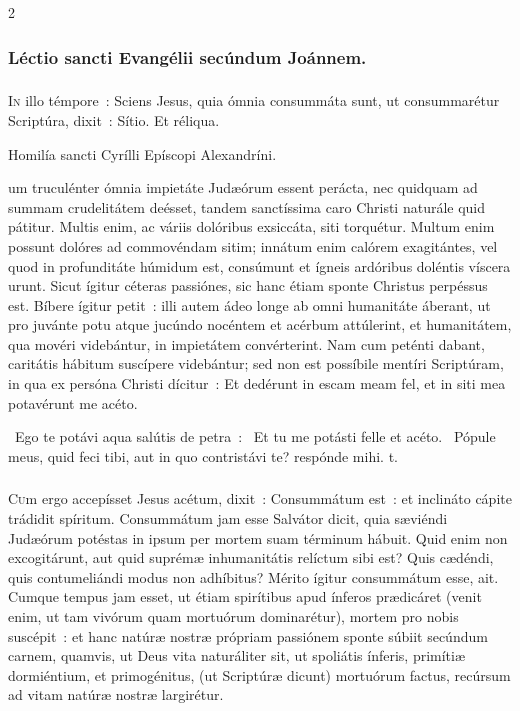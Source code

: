 \documentclass[9pt,twoside]{extarticle}
\begin{document}
\begin{multicols}{2}
{\subsubsection*{\center Léctio sancti Evangélii secúndum Joánnem.}
\subsubsection*{\center {}}
\lettrine{I}n illo témpore~: Sciens Jesus, quia ómnia consummáta sunt, ut consummarétur Scriptúra, dixit~: Sítio. Et réliqua.

\begin{center}Homilía sancti Cyrílli Epíscopi Alexandríni.\\
\end{center}
um truculénter ómnia impietáte Judæórum essent perácta, nec quidquam ad summam crudelitátem deésset, tandem sanctíssima caro Christi naturále quid pátitur. Multis enim, ac váriis dolóribus exsiccáta, siti torquétur. Multum enim possunt dolóres ad commovéndam sitim; innátum enim calórem exagitántes, vel quod in profunditáte húmidum est, consúmunt et ígneis ardóribus doléntis víscera urunt. Sicut ígitur céteras passiónes, sic hanc étiam sponte Christus perpéssus est. Bíbere ígitur petit~: illi autem ádeo longe ab omni humanitáte áberant, ut pro juvánte potu atque jucúndo nocéntem et acérbum attúlerint, et humanitátem, qua movéri videbántur, in impietátem convérterint. Nam cum peténti dabant, caritátis hábitum suscípere videbántur; sed non est possíbile mentíri Scriptúram, in qua ex persóna Christi dícitur~: Et dedérunt in escam meam fel, et in siti mea potavérunt me acéto.

\begin{tightlist}{}
\item {}~Ego te potávi aqua salútis de petra~: \textred{*}~Et tu me potásti felle et acéto. ~Pópule meus, quid feci tibi, aut in quo contristávi te? respónde mihi. t.
\end{tightlist}

\subsubsection*{\center{}}
\lettrine{C}um ergo accepísset Jesus acétum, dixit~: Consummátum est~: et inclináto cápite trádidit spíritum. Consummátum jam esse Salvátor dicit, quia sæviéndi Judæórum potéstas in ipsum per mortem suam términum hábuit. Quid enim non excogitárunt, aut quid suprémæ inhumanitátis relíctum sibi est? Quis cædéndi, quis contumeliándi modus non adhíbitus? Mérito ígitur consummátum esse, ait. Cumque tempus jam esset, ut étiam spirítibus apud ínferos prædicáret (venit enim, ut tam vivórum quam mortuórum dominarétur), mortem pro nobis suscépit~: et hanc natúræ nostræ própriam passiónem sponte súbiit secúndum carnem, quamvis, ut Deus vita naturáliter sit, ut spoliátis ínferis, primítiæ dormiéntium, et primogénitus, (ut Scriptúræ dicunt) mortuórum factus, recúrsum ad vitam natúræ nostræ largirétur.

}
\end{multicols}
\end{document}
